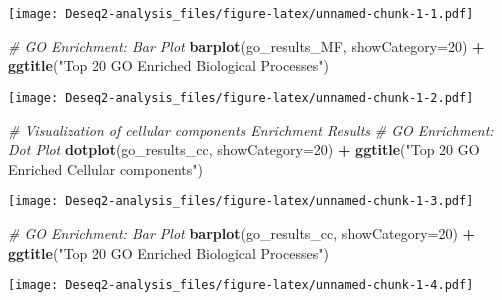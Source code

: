 \documentclass[
]{article}
\newenvironment{Shaded}{\begin{snugshade}}{\end{snugshade}}
\newcommand{\AttributeTok}[1]{\textcolor[rgb]{0.13,0.29,0.53}{#1}}
\newcommand{\CommentTok}[1]{\textcolor[rgb]{0.56,0.35,0.01}{\textit{#1}}}
\newcommand{\DecValTok}[1]{\textcolor[rgb]{0.00,0.00,0.81}{#1}}
\newcommand{\FunctionTok}[1]{\textcolor[rgb]{0.13,0.29,0.53}{\textbf{#1}}}
\newcommand{\NormalTok}[1]{#1}
\newcommand{\SpecialCharTok}[1]{\textcolor[rgb]{0.81,0.36,0.00}{\textbf{#1}}}
\newcommand{\StringTok}[1]{\textcolor[rgb]{0.31,0.60,0.02}{#1}}
\begin{document}
\texttt{[image: Deseq2-analysis\_files/figure-latex/unnamed-chunk-1-1.pdf]}

\begin{Shaded}
\begin{Highlighting}[]
\CommentTok{\# GO Enrichment: Bar Plot}
\FunctionTok{barplot}\NormalTok{(go\_results\_MF, }\AttributeTok{showCategory=}\DecValTok{20}\NormalTok{) }\SpecialCharTok{+} \FunctionTok{ggtitle}\NormalTok{(}\StringTok{"Top 20 GO Enriched Biological Processes"}\NormalTok{)}
\end{Highlighting}
\end{Shaded}

\texttt{[image: Deseq2-analysis\_files/figure-latex/unnamed-chunk-1-2.pdf]}

\begin{Shaded}
\begin{Highlighting}[]
\CommentTok{\# Visualization of cellular components Enrichment Results}
\CommentTok{\# GO Enrichment: Dot Plot}
\FunctionTok{dotplot}\NormalTok{(go\_results\_cc, }\AttributeTok{showCategory=}\DecValTok{20}\NormalTok{) }\SpecialCharTok{+} \FunctionTok{ggtitle}\NormalTok{(}\StringTok{"Top 20 GO Enriched Cellular components"}\NormalTok{)}
\end{Highlighting}
\end{Shaded}

\texttt{[image: Deseq2-analysis\_files/figure-latex/unnamed-chunk-1-3.pdf]}

\begin{Shaded}
\begin{Highlighting}[]
\CommentTok{\# GO Enrichment: Bar Plot}
\FunctionTok{barplot}\NormalTok{(go\_results\_cc, }\AttributeTok{showCategory=}\DecValTok{20}\NormalTok{) }\SpecialCharTok{+} \FunctionTok{ggtitle}\NormalTok{(}\StringTok{"Top 20 GO Enriched Biological Processes"}\NormalTok{)}
\end{Highlighting}
\end{Shaded}

\texttt{[image: Deseq2-analysis\_files/figure-latex/unnamed-chunk-1-4.pdf]}
\end{document}
